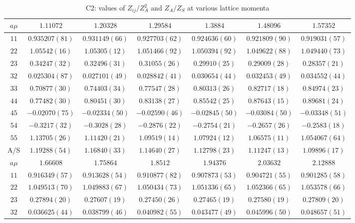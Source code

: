 \begin{table}
\begin{center}
\caption{C2: values of $Z_{ij}/Z_A^2$ and $Z_A/Z_S$ at various lattice momenta}
\begin{tabular}{c|c c c c c c}
\hline
\hline
$a\mu$ & $1.11072$ & $1.20328$ & $1.29584$ & $1.3884$ & $1.48096$ & $1.57352$ \\
\hline
$11$ & $0.935207(81)$ & $0.931149(66)$ & $0.927703(62)$ & $0.924636(60)$ & $0.921809(90)$ & $0.919031(57)$ \\
$22$ & $1.05542(16)$ & $1.05305(12)$ & $1.051466(92)$ & $1.050394(92)$ & $1.049622(88)$ & $1.049440(73)$ \\
$23$ & $0.34247(32)$ & $0.32496(31)$ & $0.31055(26)$ & $0.29910(25)$ & $0.29009(28)$ & $0.28357(21)$ \\
$32$ & $0.025304(87)$ & $0.027101(49)$ & $0.028842(41)$ & $0.030654(44)$ & $0.032453(49)$ & $0.034552(44)$ \\
$33$ & $0.70877(30)$ & $0.74403(34)$ & $0.77547(28)$ & $0.80313(26)$ & $0.82717(18)$ & $0.84974(23)$ \\
$44$ & $0.77482(30)$ & $0.80451(30)$ & $0.83138(27)$ & $0.85542(25)$ & $0.87643(15)$ & $0.89681(24)$ \\
$45$ & $-0.02070(75)$ & $-0.02334(50)$ & $-0.02590(46)$ & $-0.02845(50)$ & $-0.03084(50)$ & $-0.03348(51)$ \\
$54$ & $-0.3217(32)$ & $-0.3028(28)$ & $-0.2876(22)$ & $-0.2754(21)$ & $-0.2657(26)$ & $-0.2583(18)$ \\
$55$ & $1.13705(26)$ & $1.11420(21)$ & $1.09519(14)$ & $1.07924(12)$ & $1.06575(11)$ & $1.054067(64)$ \\
\hline
A/S & $1.19288(54)$ & $1.16840(33)$ & $1.14640(27)$ & $1.12798(23)$ & $1.11247(13)$ & $1.09896(17)$ \\
\hline
$a\mu$ & $1.66608$ & $1.75864$ & $1.8512$ & $1.94376$ & $2.03632$ & $2.12888$ \\
\hline
$11$ & $0.916349(57)$ & $0.913628(54)$ & $0.910877(82)$ & $0.907873(53)$ & $0.904721(55)$ & $0.901285(58)$ \\
$22$ & $1.049513(70)$ & $1.049883(67)$ & $1.050434(73)$ & $1.051336(65)$ & $1.052366(65)$ & $1.053578(66)$ \\
$23$ & $0.27894(20)$ & $0.27607(19)$ & $0.27450(26)$ & $0.27465(19)$ & $0.27580(19)$ & $0.27809(20)$ \\
$32$ & $0.036625(44)$ & $0.038799(46)$ & $0.040982(55)$ & $0.043477(49)$ & $0.045996(50)$ & $0.048657(51)$ \\

\end{tabular}
\end{center}
\end{table}
